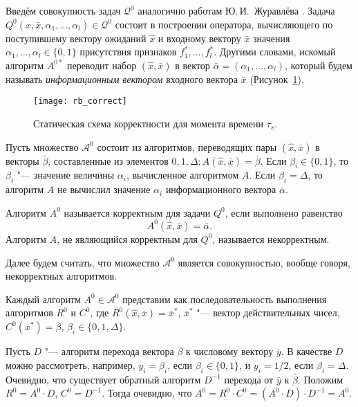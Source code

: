 Введём совокупность задач $\mathcal Q^0$ аналогично работам Ю.\,И.~Журавлёва \cite{Zhuravlev1977}. Задача $Q^0(\hat{x},\bar{x},\alpha_1,\dots,\alpha_l)\in\mathcal Q^0$ состоит в построении оператора, вычисляющего по поступившему вектору ожиданий $\hat{x}$ и входному вектору $\bar{x}$ значения $\alpha_1,\dots,\alpha_l\in\{0,1\}$ присутствия признаков $f_1^*,\dots,f_l^*$. Другими словами, искомый алгоритм $A^{0*}$ переводит набор $(\hat{x},\bar{x})$ в вектор $\bar{\alpha}=(\alpha_1,\dots,\alpha_l)$, который будем называть \textit{информационным вектором} входного вектора $\bar{x}$ (Рисунок~\ref{fig:rb_correct_stat0}).
	
\begin{figure}[h]
	\centering
	\texttt{[image: rb\_correct]}
	\caption{Статическая схема корректности для момента времени $\tau_s$.}
	\label{fig:rb_correct_stat0}
\end{figure}

Пусть множество $\mathcal A^0$ состоит из алгоритмов, переводящих пары $(\hat{x},\bar{x})$ в векторы $\bar{\beta}$, составленные из элементов $0,1,\Delta:A(\hat{x},\bar{x})=\bar{\beta}$. Если $\beta_i\in\{0,1\}$, то $\beta_i$ "--- значение величины $\alpha_i$, вычисленное алгоритмом $A$. Если $\beta_i=\Delta$, то алгоритм $A$ не вычислил значение $\alpha_i$ информационного вектора $\bar\alpha$.
	
\begin{Def}
	Алгоритм $A^0$ называется корректным для задачи $Q^0$, если выполнено равенство
	\begin{equation}
		A^0(\hat{x},\bar{x})=\bar{\alpha}.
	\end{equation}
	Алгоритм $A$, не являющийся корректным для $Q^0$, называется некорректным.
\end{Def}

Далее будем считать, что множество $\mathcal A^0$ является совокупностью, вообще говоря, некорректных алгоритмов.
	
\begin{Pred}
	\label{pred:decompositon}
	Каждый алгоритм $A^0\in\mathcal A^0$ представим как последовательность выполнения алгоритмов $R^0$ и $C^0$, где $R^0(\hat{x},\bar{x})=\bar{x}^*$, $\bar{x}^*$ "--- вектор действительных чисел, $C^0(\bar{x}^*)=\bar{\beta}$, $\beta_i\in\{0,1,\Delta\}$.
\end{Pred}
	
\begin{Proof}
	Пусть $D$ "--- алгоритм перехода вектора $\bar{\beta}$ к числовому вектору $\bar{y}$. В качестве $D$ можно рассмотреть, например, $y_i=\beta_i$, если $\beta_i\in\{0,1\}$, и $y_i=1/2$, если $\beta_i=\Delta$. Очевидно, что существует обратный алгоритм $D^{-1}$ перехода от $\bar{y}$ к $\bar{\beta}$. Положим $R^0=A^0\cdot D$, $C^0=D^{-1}$. Тогда очевидно, что $A^0=R^0\cdot C^0=(A^0\cdot D)\cdot D^{-1}=A^0$.
\end{Proof}

